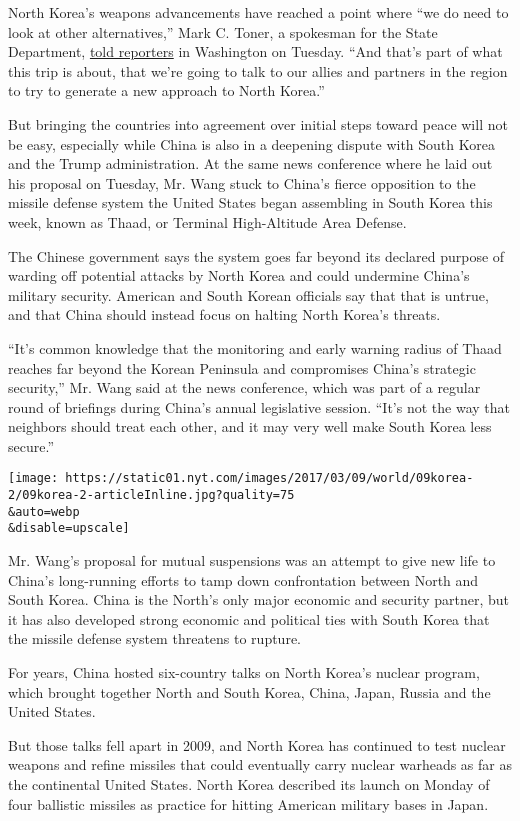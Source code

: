 North Korea's weapons advancements have reached a point where ``we do
need to look at other alternatives,'' Mark C. Toner, a spokesman for the
State Department,
\href{https://www.state.gov/r/pa/prs/dpb/2017/03/268288.htm}{told
reporters} in Washington on Tuesday. ``And that's part of what this trip
is about, that we're going to talk to our allies and partners in the
region to try to generate a new approach to North Korea.''

But bringing the countries into agreement over initial steps toward
peace will not be easy, especially while China is also in a deepening
dispute with South Korea and the Trump administration. At the same news
conference where he laid out his proposal on Tuesday, Mr. Wang stuck to
China's fierce opposition to the missile defense system the United
States began assembling in South Korea this week, known as Thaad, or
Terminal High-Altitude Area Defense.

The Chinese government says the system goes far beyond its declared
purpose of warding off potential attacks by North Korea and could
undermine China's military security. American and South Korean officials
say that that is untrue, and that China should instead focus on halting
North Korea's threats.

``It's common knowledge that the monitoring and early warning radius of
Thaad reaches far beyond the Korean Peninsula and compromises China's
strategic security,'' Mr. Wang said at the news conference, which was
part of a regular round of briefings during China's annual legislative
session. ``It's not the way that neighbors should treat each other, and
it may very well make South Korea less secure.''

\texttt{[image: https://static01.nyt.com/images/2017/03/09/world/09korea-2/09korea-2-articleInline.jpg?quality=75\\\&auto=webp\\\&disable=upscale]}

Mr. Wang's proposal for mutual suspensions was an attempt to give new
life to China's long-running efforts to tamp down confrontation between
North and South Korea. China is the North's only major economic and
security partner, but it has also developed strong economic and
political ties with South Korea that the missile defense system
threatens to rupture.

For years, China hosted six-country talks on North Korea's nuclear
program, which brought together North and South Korea, China, Japan,
Russia and the United States.

But those talks fell apart in 2009, and North Korea has continued to
test nuclear weapons and refine missiles that could eventually carry
nuclear warheads as far as the continental United States. North Korea
described its launch on Monday of four ballistic missiles as practice
for hitting American military bases in Japan.


